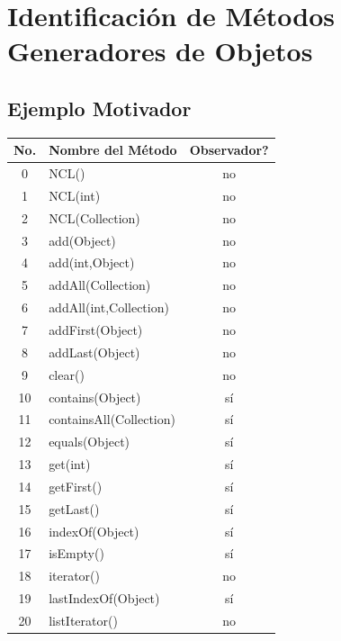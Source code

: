 
\chapter[Identificación de Métodos Generadores de Objetos]{Identificación de Métodos Generadores de Objetos}
\label{cap:builders}

\section{Ejemplo Motivador}
\label{sec:motivacionBuilders}

\begin{table}[H]
\centering
\scriptsize
\begin{tabular}{clc}
\toprule
No. & Nombre del Método & Observador? \\
\midrule
0  & NCL()                        & no \\
1  & NCL(int)                     & no \\
2  & NCL(Collection)              & no \\
3  & add(Object)                  & no \\
4  & add(int,Object)              & no \\
5  & addAll(Collection)           & no \\
6  & addAll(int,Collection)       & no \\
7  & addFirst(Object)             & no \\
8  & addLast(Object)              & no \\
9  & clear()                      & no \\
10 & contains(Object)             & sí \\
11 & containsAll(Collection)      & sí \\
12 & equals(Object)               & sí \\
13 & get(int)                     & sí \\
14 & getFirst()                   & sí \\
15 & getLast()                    & sí \\
16 & indexOf(Object)              & sí \\
17 & isEmpty()                    & sí \\
18 & iterator()                   & no \\
19 & lastIndexOf(Object)          & sí \\
20 & listIterator()               & no \\

\end{tabular}
\end{table}
